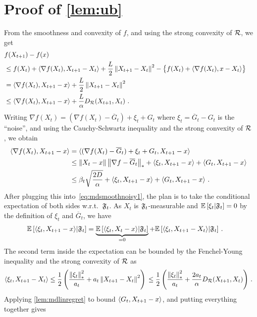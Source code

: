 \section{Proof of \cref{lem:ub}}
From the smoothness and convexity of $f$, and using the strong convexity of $\mathcal{R}$, we get
\begin{align}
\lefteqn{f(X_{t+1}) - f(x)  } \nonumber \\
& \le  f(X_t) + \ip{\nabla f(X_t), X_{t+1}-X_t} + \frac{L}{2} \norm{X_{t+1}-X_t}^2 - \big\{f(X_t) + \ip{\nabla f(X_t) , x- X_t} \big\}  \nonumber \\
& = \ip{\nabla f(X_t), X_{t+1}-x} + \frac{L}{2}\norm{ X_{t+1} - X_t}^2 \nonumber \\
& \le \ip{\nabla f(X_t), X_{t+1}-x} + \frac{L}{\alpha} D_{\cR}(X_{t+1},X_t)~. \label{eq:mdsmoothnoisy1}
\end{align}
Writing
$\nabla f (X_t) = (\nabla f(X_t)-\overline G_t)  + \xi_t + G_t$ where $\xi_t = \overline G_t - G_t$ is the ``noise'', and using the Cauchy-Schwartz inequality
and the strong convexity of $\mathcal{R}$,
we obtain
\begin{align*}
\langle \nabla f(X_{t}),X_{t+1}-x \rangle
 &= \langle (\nabla f(X_t)-\overline G_t)  + \xi_t + G_t,X_{t+1}-x \rangle  \nonumber \\
 & \le \left\|X_t-x\right\|\left\|\nabla f-\overline G_t\right\|_* + \langle \xi_t,X_{t+1}-x \rangle + \langle  G_t, X_{t+1} - x  \rangle \nonumber \\
&\le \beta_t \sqrt{ \frac{2D}{\alpha} } + \langle \xi_t,X_{t+1}-x \rangle + \langle  G_t, X_{t+1} - x  \rangle~.
\end{align*}
After plugging this into~\eqref{eq:mdsmoothnoisy1},
the plan is to take the conditional expectation of both sides w.r.t.\  $\mathfrak{F}_{t}$.
As $X_t$ is $\mathfrak{F}_{t}$-measurable and $\mathbb{E}\left[ \xi_t|\mathfrak{F}_{t}\right] = 0$ by the definition of $\xi_t$ and $\overline G_t$,
we have
\begin{align*}
\MoveEqLeft
\EE{\ip{\xi_t, X_{t+1}-x}|\cS_{t}} = \underbrace{\EE{\ip{\xi_t,X_{t}-x}|\cS_{t}}}_{=0} + \EE{\ip{\xi_t,X_{t+1}-X_t}|\cS_{t}} \,.
\end{align*}
The second term inside the expectation can be bounded by the Fenchel-Young inequality and the strong convexity of $\mathcal{R}$ as
\[
\langle \xi_t,X_{t+1}-X_t \rangle \le \frac12 \left(\frac{\left\|\xi_t\right\|_*^2}{a_t} + a_t \left\|X_{t+1}-X_t\right\|^2\right)\,
\le \frac12 \left(\frac{\left\|\xi_t\right\|_*^2}{a_t} + \frac{2a_t}{\alpha} D_{\mathcal{R}}(X_{t+1},X_t) \right)\,.
\]
Applying
\cref{lem:mdlinregret}
to bound $\langle  G_t, X_{t+1} - x  \rangle$, and putting everything together gives
